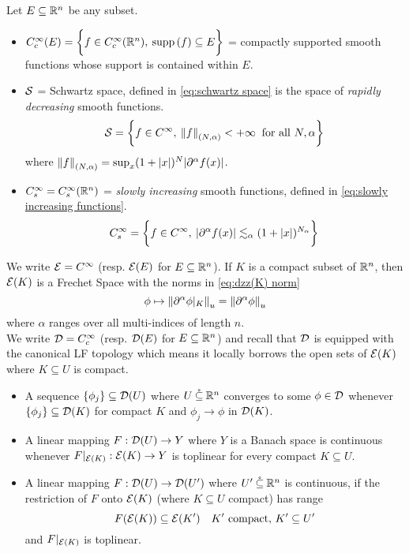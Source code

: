 \documentclass[../main-v2-manifolds.tex]{subfiles}
\begin{document}
Let $E\subseteq {\mathbb{R}^n}$ be any subset.
\begin{itemize}
    \item $C^\infty_c(E)=\biggl\{{f\in C_c^\infty({\mathbb{R}^n}),\: \operatorname{supp}{(f)}\subseteq E}\biggr\}$ = compactly supported smooth functions whose support is contained within $E$.
\end{itemize}
\begin{itemize}
    \item $\mathcal{S}$ = Schwartz space, defined in \cref{eq:schwartz space} is the space of \emph{rapidly decreasing} smooth functions.
        \begin{equation}
        \mathcal{S}=\biggl\{{f\in C^\infty,\: \norm{f}_{(N,\alpha)} <+\infty\:\text{ for all }N,\alpha}\biggr\}
        \label{eq:schwartz space}
    \end{equation}
    where $\norm{f}_{(N,\alpha)} = \sup_{x}(1+\vert {x} \vert)^{N}\vert {\partial^\alpha f(x)} \vert$.
    \item $C_s^\infty= C_s^\infty({\mathbb{R}^n})$ = \emph{slowly increasing} smooth functions, defined in \cref{eq:slowly increasing functions}.
        \begin{equation}\label{eq:slowly increasing functions}
        C_s^\infty = \biggl\{{f\in C^\infty,\: \vert {\partial^\alpha f(x)} \vert\lesssim_\alpha (1+\vert {x} \vert)^{N_{\alpha}}}\biggr\}
    \end{equation}
\end{itemize}

We write $\mathcal{E} = C^\infty$ (resp. $\mathcal{E}(E)$ for $E\subseteq{\mathbb{R}^n}$). If $K$ is a compact subset of ${\mathbb{R}^n}$, then $\mathcal{E}(K)$ is a Frechet Space with the norms in \cref{eq:dzz(K) norm}
\begin{equation}\label{eq:dzz(K) norm}
    \phi\mapsto \norm{\partial^\alpha\phi\vert_K}_u = \norm{\partial^\alpha\phi}_u
\end{equation}
where $\alpha$ ranges over all multi-indices of length $n$. \\

We write $\mathcal{D} = C^\infty_c$ (resp. $\mathcal{D}(E)$ for $E\subseteq{\mathbb{R}^n}$) and recall that $\mathcal{D}$ is equipped with the canonical LF topology which means it locally borrows the open sets of $\mathcal{E}(K)$ where $K\subseteq U$ is compact. 
\begin{itemize}
    \item A sequence $\{\phi_j\}\subseteq\mathcal{D}(U)$ where $U\:\mathring{\subseteq}\:{\mathbb{R}^n}$ converges to some $\phi\in \mathcal{D}$ whenever $\{\phi_j\}\subseteq \mathcal{D}(K)$ for compact $K$ and $\phi_j\to \phi$ in $\mathcal{D}(K)$.
    \item A linear mapping $F: \mathcal{D}(U)\to Y$ where $Y$ is a Banach space is continuous whenever $F\vert_{\mathcal{E}(K)}: \mathcal{E}(K)\to Y$ is toplinear for every compact $K\subseteq U$.
    \item A linear mapping $F:\mathcal{D}(U)\to \mathcal{D}(U')$ where $U'\:\mathring{\subseteq}\: {\mathbb{R}^n}$ is continuous, if the restriction of $F$ onto $\mathcal{E}(K)$ (where $K\subseteq U$ compact) has range 
    \[
        F(\mathcal{E}(K))\subseteq\mathcal{E}(K')\quad K'\text{ compact, } K'\subseteq U'
    \]
    and $F\vert_{\mathcal{E}(K)}$ is toplinear.
\end{itemize}
\end{document}
